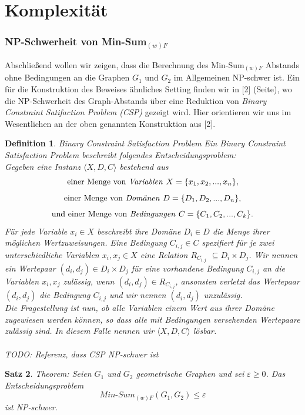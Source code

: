 \documentclass[a4paper, 12pt, twoside]{article}
\theoremstyle{Format1} %
\newtheorem{Def}{Definition}[section]       %
\newtheorem{Satz}[Def]{Satz}                %
\begin{document}
\section{Komplexität}

\subsubsection{NP-Schwerheit von Min-Sum$_{(w)F}$}

Abschließend wollen wir zeigen, dass die Berechnung des Min-Sum$_{(w)F}$ Abstands ohne Bedingungen an die Graphen $G_1$ und $G_2$ im Allgemeinen
NP-schwer ist. Ein für die Konstruktion des Beweises ähnliches Setting finden wir in [2] (Seite), wo die NP-Schwerheit des Graph-Abstands
über eine Reduktion von \textit{Binary Constraint Satifaction Problem (CSP)} gezeigt wird.
Hier orientieren wir uns im Wesentlichen an der oben genannten Konstruktion aus [2].

\begin{Def}
	Binary Constraint Satisfaction Problem
	Ein \textit{Binary Constraint Satisfaction Problem} beschreibt folgendes Entscheidungsproblem:
	\\
	Gegeben eine Instanz $\langle X,D,C \rangle$ bestehend aus
	$$ \text{einer Menge von \textit{Variablen }}X = \{x_1, x_2, ..., x_n\}, $$
	$$ \text{einer Menge von \textit{Domänen }}D = \{D_1, D_2, ..., D_n\}, $$
	$$ \text{und einer Menge von \textit{Bedingungen }}C = \{C_1, C_2, ..., C_k\}. $$
	Für jede Variable $ x_i \in X$ beschreibt ihre Domäne $ D_i \in D$ die Menge ihrer möglichen Wertzuweisungen.
	Eine Bedingung $C_{i,j} \in C$ spezifiert für je zwei unterschiedliche Variablen $x_i, x_j \in X$ eine Relation $R_{C_{i,j}}$ $\subseteq D_i \times D_j$.
	Wir nennen ein Wertepaar $(d_i, d_j) \in D_i \times D_j$ für eine vorhandene Bedingung $C_{i,j}$ an die Variablen $x_i,x_j$ \textit{zulässig}, wenn $(d_i,d_j) \in R_{C_{i,j}}$,
	ansonsten \textit{verletzt} das Wertepaar $(d_i, d_j)$ die Bedingung $C_{i,j}$ und wir nennen $(d_i,d_j)$ \textit{unzulässig}.
	\\
	Die Fragestellung ist nun, ob alle Variablen einem Wert aus ihrer Domäne zugewiesen werden können, so dass alle mit Bedingungen versehenden Wertepaare zulässig sind.
	In diesem Falle nennen wir $\langle X,D,C \rangle$ \textit{lösbar}.
	\\
	\\
	TODO: Referenz, dass CSP NP-schwer ist
\end{Def}

\begin{Satz} \label{Satz NP-Schwerheit}
	Theorem: Seien $G_1$ und $G_2$ geometrische Graphen und sei $\varepsilon \geq 0$.
	Das Entscheidungsproblem $$ \textit{Min-Sum}_{(w)F}(G_1, G_2) \leq  \varepsilon $$ ist NP-schwer.
\end{Satz}
\end{document}
